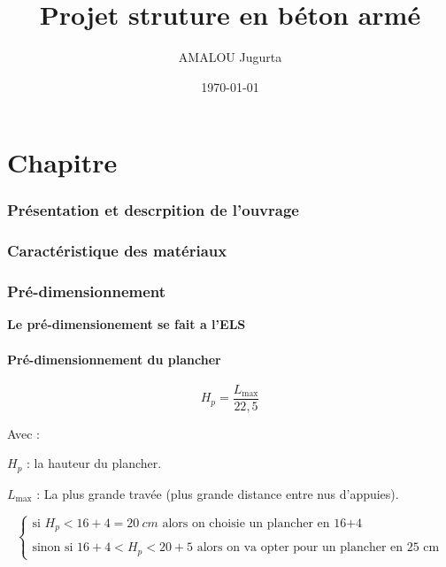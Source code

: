 \documentclass[12pt,a4paper]{article}
\title{Projet struture en béton armé}
\author{AMALOU Jugurta}
\date{\today}
\newcommand{\RomanNum}[1] %
{\MakeUppercase{\romannumeral #1}}
\begin{document}
	
	
	\tableofcontents
	
	\newpage
	
	\part{Chapitre \RomanNum{1}}
	
	
	
	
	\section{Présentation et descrpition de l'ouvrage}
	
	
	
	
	\section{Caractéristique des matériaux}
	
	
	
	
	
	\section{Pré-dimensionnement}
	
	\textbf{Le pré-dimensionement se fait a l'ELS}
	
	
	
	
	\subsection{Pré-dimensionnement du plancher}
	
	
	
	
	\[ H_{p} = \dfrac{L_{\max}}{22,5} \]
	
	Avec :
	
	$H_{p}$ : la hauteur du plancher.
	
	$L_{\max}$ : La plus grande travée (plus grande distance entre nus d'appuies).
	
	
	
	\[ \begin{cases}
		\text{si  } H_{p} < 16+4 = 20~\unit{cm} \text{  alors on choisie un plancher en 16+4} \\\\
		\text{sinon si  } 16+4 < H_{p} < 20+5 \text{  alors on va opter pour un plancher en 25 cm} 
	\end{cases} \]
	
\end{document}
